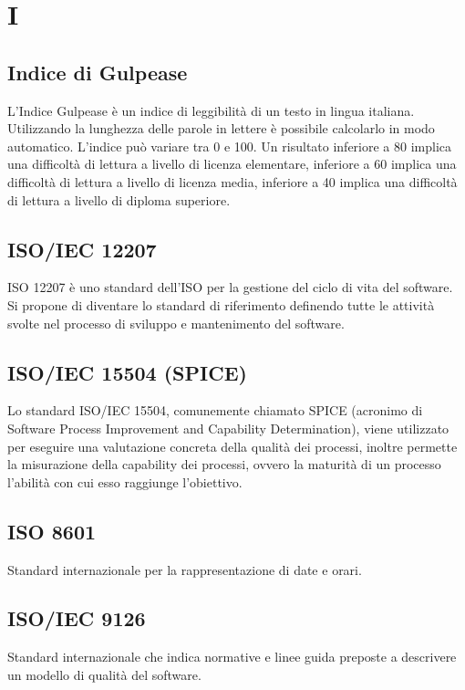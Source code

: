 	\section{I}
	\subsection{Indice di Gulpease}
	L'Indice Gulpease è un indice di leggibilità di un testo in lingua italiana. Utilizzando la lunghezza delle parole in lettere è possibile calcolarlo in modo automatico. L'indice può variare tra 0 e 100. Un risultato inferiore a 80 implica una difficoltà di lettura a livello di licenza elementare, inferiore a 60 implica una difficoltà di lettura a livello di licenza media, inferiore a 40 implica una difficoltà di lettura a livello di diploma superiore.
	
	\subsection{ISO/IEC 12207}
		ISO 12207 è uno standard dell'ISO per la gestione del ciclo di vita del software. Si propone di diventare lo standard di riferimento definendo tutte le attività svolte nel processo di sviluppo e mantenimento del software.
	\subsection{ISO/IEC 15504 (SPICE)}
	Lo standard ISO/IEC 15504, comunemente chiamato SPICE (acronimo di Software Process Improvement and Capability Determination), viene utilizzato per eseguire una valutazione concreta della qualità dei processi, inoltre permette la misurazione della capability dei processi, ovvero la maturità
	di un processo l’abilità con cui esso raggiunge l’obiettivo.

	\subsection{ISO 8601}
	Standard internazionale per la rappresentazione di date e orari.
	
	\subsection{ISO/IEC 9126}
	Standard internazionale che indica normative e linee guida preposte a descrivere un modello di qualità del software.
	
